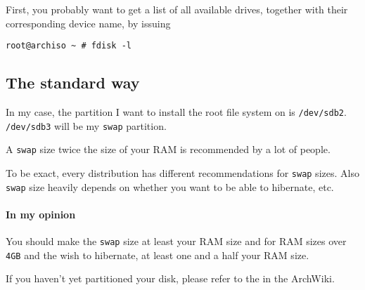 \documentclass[10pt]{dustdoc}
\begin{document}
First, you probably want to get a list of all available drives, together with their corresponding device name, by issuing

\begin{verbatim}
root@archiso ~ # fdisk -l
\end{verbatim}


\subsection{The standard way}
\label{sec:the-standard-way}

In my case, the partition I want to install the root file system on is \texttt{/dev/sdb2}.
\texttt{/dev/sdb3} will be my \texttt{swap} partition.

\begin{NOTE}
    A \texttt{swap} size twice the size of your RAM is recommended by a lot of people.

    To be exact, every distribution has different recommendations for \texttt{swap} sizes.
    Also \texttt{swap} size heavily depends on whether you want to be able to hibernate, etc.

    \paragraph{In my opinion}
    You should make the \texttt{swap} size at least your RAM size and for RAM sizes over \texttt{4GB} and the wish to hibernate, at least one and a half your RAM size.
\end{NOTE}

\begin{IMPORTANT}
    If you haven’t yet partitioned your disk, please refer to the  in the ArchWiki.
\end{IMPORTANT}
\end{document}
